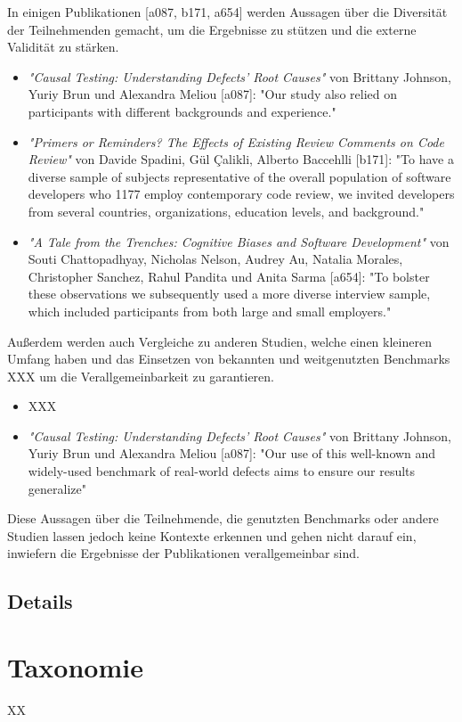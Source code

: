 In einigen Publikationen [a087, b171, a654] werden Aussagen über die Diversität der Teilnehmenden gemacht, um die Ergebnisse zu stützen und die externe Validität zu stärken.
\begin{itemize}
    \item \textit{"Causal Testing: Understanding Defects’ Root Causes"} von Brittany Johnson, Yuriy Brun und Alexandra Meliou [a087]: "Our study also relied on participants with different backgrounds and experience." 
      \item \textit{"Primers or Reminders? The Effects of Existing Review Comments on Code Review"} von Davide Spadini, Gül Çalikli, Alberto Baccehlli [b171]: "To have a diverse sample of subjects representative of the overall population of software developers who 1177 employ contemporary code review, we invited developers from several countries, organizations, education levels, and background."
    \item \textit{"A Tale from the Trenches: Cognitive Biases and Software Development"} von Souti Chattopadhyay, Nicholas Nelson, Audrey Au, Natalia Morales, Christopher Sanchez, Rahul Pandita und Anita Sarma [a654]: "To bolster these observations we subsequently used a more diverse interview sample, which included participants from both large and small employers."
\end{itemize}

Außerdem werden auch Vergleiche zu anderen Studien, welche einen kleineren Umfang haben und das Einsetzen von bekannten und weitgenutzten Benchmarks XXX um die Verallgemeinbarkeit zu garantieren. 
\begin{itemize}
    \item XXX
    \item \textit{"Causal Testing: Understanding Defects’ Root Causes"} von Brittany Johnson, Yuriy Brun und Alexandra Meliou [a087]: "Our use of this well-known and widely-used benchmark of real-world defects aims to ensure our results generalize"
\end{itemize}

Diese Aussagen über die Teilnehmende, die genutzten Benchmarks oder andere Studien lassen jedoch keine Kontexte erkennen und gehen nicht darauf ein, inwiefern die Ergebnisse der Publikationen verallgemeinbar sind. 

\clearpage
\subsection{Details}





\section{Taxonomie}
XX 

